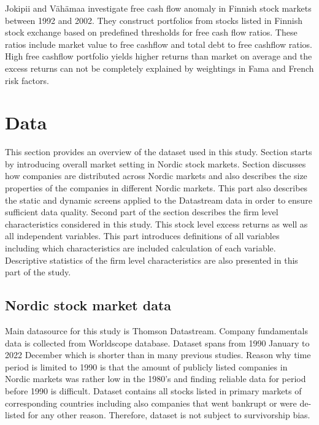 \documentclass{article}
\begin{document}
Jokipii and Vähämaa \citeyear{jokipii2006free} investigate free cash flow anomaly in Finnish stock markets between 1992 and 2002. They construct portfolios from stocks listed in Finnish stock exchange based on predefined thresholds for free cash flow ratios. These ratios include market value to free cashflow and total debt to free cashflow ratios. High free cashflow portfolio yields higher returns than market on average and the excess returns can not be completely explained by weightings in Fama and French \citeyear{FAMA19933} risk factors. \par

\section{Data}\label{Data}

This section provides an overview of the dataset used in this study. Section starts by introducing overall market setting in Nordic stock markets. Section discusses how companies are distributed across Nordic markets and also describes the size properties of the companies in different Nordic markets. This part also describes the static and dynamic screens applied to the Datastream data in order to ensure sufficient data quality. Second part of the section describes the firm level characteristics considered in this study. This stock level excess returns as well as all independent variables. This part introduces definitions of all variables including which characteristics are included calculation of each variable. Descriptive statistics of the firm level characteristics are also presented in this part of the study. \par

\subsection{Nordic stock market data}\label{NordicStockMarketData}

Main datasource for this study is Thomson Datastream. Company fundamentals data is collected from Worldscope database. Dataset spans from 1990 January to 2022 December which is shorter than in many previous studies. Reason why time period is limited to 1990 is that the amount of publicly listed companies in Nordic markets was rather low in the 1980's and finding reliable data for period before 1990 is difficult. Dataset contains all stocks listed in primary markets of corresponding countries including also companies that went bankrupt or were de-listed for any other reason. Therefore, dataset is not subject to survivorship bias. \par
\end{document}
